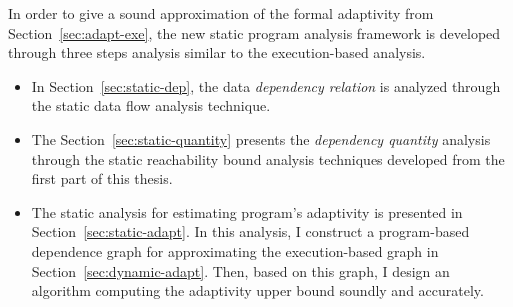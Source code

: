 In order to give a sound approximation of the formal adaptivity from Section~\ref{sec:adapt-exe}, 
the new static program analysis framework is developed through three steps analysis
similar to the execution-based analysis.
\begin{itemize}
   \item In Section~\ref{sec:static-dep},
   the data \emph{dependency relation} is analyzed through the static data flow analysis technique.
   \item The Section~\ref{sec:static-quantity} presents the \emph{dependency quantity} analysis through
   the static reachability bound analysis techniques developed from the first part of this thesis.
   \item The static analysis for estimating program's adaptivity is presented in Section~\ref{sec:static-adapt}.
   In this analysis, I construct a program-based dependence graph for approximating the execution-based graph in Section~\ref{sec:dynamic-adapt}.
   Then, based on this graph, I design an algorithm
   computing the adaptivity upper bound soundly 
   and accurately.
   \end{itemize}